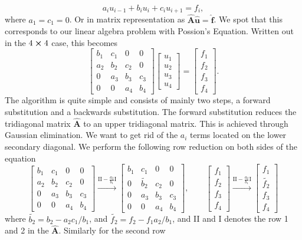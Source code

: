 \documentclass[a4paper,10pt]{article}
\begin{document}
\begin{equation}\label{eq:5}
a_i u_{i-1} + b_i u_i +c_i u_{i+1} = f_i,
\end{equation}
where $a_1 = c_1 = 0$. Or in matrix representation as $\mathbf{\hat{A}} \mathbf{\hat{u}} = \mathbf{\hat{f}}$. We spot that this corresponds to our linear algebra problem with Possion's Equation. Written out in the $4 \cross 4$ case, this becomes
\begin{equation}\label{eq:6}
\begin{bmatrix}
b_1 & c_1 & 0 & 0 \\
a_2& b_2 & c_2 & 0 \\
0 & a_3 & b_3 & c_3 \\
0 & 0 & a_4 & b_4 
\end{bmatrix}
\begin{bmatrix}
u_1 \\
u_2 \\
u_3 \\
u_4
\end{bmatrix}
=
\begin{bmatrix}
f_1\\
f_2\\
f_3\\
f_4
\end{bmatrix}.
\end{equation}
The algorithm is quite simple and consists of mainly two steps, a forward substitution and a backwards substitution. The forward substitution reduces the tridiagonal matrix $\mathbf{\hat{A}}$ to an upper tridiagonal matrix. This is achieved through Gaussian elimination. We want to get rid of the $a_i$ terms located on the lower secondary diagonal. We perform the following row reduction on both sides of the equation
\[
\begin{bmatrix}
b_1 & c_1 & 0 & 0 \\
a_2& b_2 & c_2 & 0 \\
0 & a_3 & b_3 & c_3 \\
0 & 0 & a_4 & b_4 
\end{bmatrix}
\xrightarrow{\text{II} - \frac{a_2}{b_1}\text{I}}
\begin{bmatrix}
b_1 & c_1 & 0 & 0 \\
0& \tilde{b_2}  & c_2 & 0 \\
0 & a_3 & b_3 & c_3 \\
0 & 0 & a_4 & b_4 
\end{bmatrix}, \qquad
\begin{bmatrix}
f_1\\
f_2\\
f_3\\
f_4
\end{bmatrix}
\xrightarrow{\text{II} - \frac{a_2}{b_1}\text{I}}
\begin{bmatrix}
f_1\\
\tilde{f_2}\\
f_3\\
f_4
\end{bmatrix}
\]
where $\tilde{b_2} = b_2 - a_2c_1/b_1$, and $\tilde{f_2} = f_2 - f_1a_2/b_1$, and II and I denotes the row 1 and 2 in the $\mathbf{\hat{A}}$. Similarly for the second row
\end{document}
